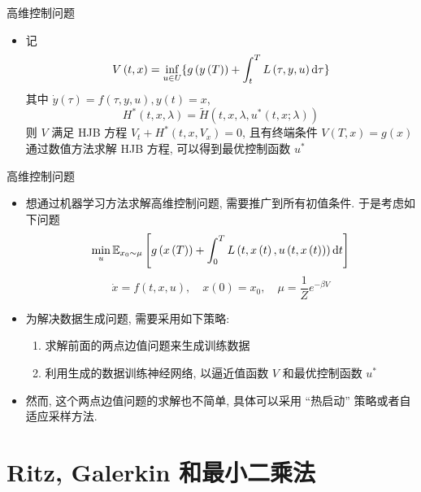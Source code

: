 \documentclass[aspectratio=169]{beamer}
\def\dif{\mathinner{\mathrm{d}}\hphantom{\mskip-\thinmuskip}}
\begin{document}
	\begin{frame}{高维控制问题}
		\begin{itemize}
			\item 记
				\begin{equation*}
					V\left(t, x\right) = \inf_{u \in U}\{g\left(y\left(T\right)\right) + \int_{t}^{T}L\left(\tau, y, u\right) \dif \tau\}
				\end{equation*}
				其中 $\dot{y}\left(\tau\right) = f\left(\tau, y, u\right), y\left(t\right) = x$,
				\begin{equation*}
					H^{*}\left(t, x, \lambda\right) = \tilde{H}\left(t, x, \lambda, u^{*}\left(t, x; \lambda\right)\right)
				\end{equation*}
				则 $V$ 满足 HJB 方程 $V_{t} + H^{*}\left(t, x, V_{x}\right) = 0$, 且有终端条件 $V\left(T, x\right) = g\left(x\right)$ 通过数值方法求解 HJB 方程, 可以得到最优控制函数 $u^{*}$
		\end{itemize}
	\end{frame}

	\begin{frame}{高维控制问题}
		\begin{itemize}
			\item 想通过机器学习方法求解高维控制问题, 需要推广到所有初值条件. 于是考虑如下问题
				\begin{equation*}
					\min_{u} \mathbb{E}_{x_{0}\sim\mu}\left[g\left(x\left(T\right)\right) + \int_{0}^{T} L\left(t, x\left(t\right), u\left(t, x\left(t\right)\right)\right) \dif t \right]
				\end{equation*}
				\begin{equation*}
					\dot{x} = f\left(t, x, u\right),\quad x\left(0\right) = x_{0},\quad \mu = \frac{1}{Z}e^{-\beta V}
				\end{equation*}
			\item 为解决数据生成问题, 需要采用如下策略:
				\begin{enumerate}
					\item 求解前面的两点边值问题来生成训练数据
					\item 利用生成的数据训练神经网络, 以逼近值函数 $V$ 和最优控制函数 $u^{*}$
				\end{enumerate}
			\item 然而, 这个两点边值问题的求解也不简单, 具体可以采用 ``热启动'' 策略或者自适应采样方法.
		\end{itemize}
	\end{frame}

	\section{Ritz, Galerkin 和最小二乘法}
\end{document}
